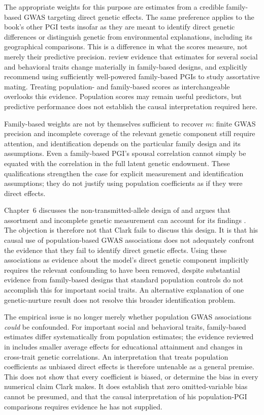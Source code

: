 \documentclass[12pt]{article}
\begin{document}
The appropriate weights for this purpose are estimates from a credible
family-based GWAS targeting direct genetic effects. The same preference
applies to the book's other PGI tests insofar as they are meant to identify
direct genetic differences or distinguish genetic from environmental
explanations, including its geographical comparisons. This is a difference
in what the scores measure, not merely their predictive precision.
\citet[Sections~4 and~6.4]{BenjaminEtAl2026} review evidence that estimates
for several social and behavioral traits change materially in family-based
designs, and explicitly recommend using sufficiently well-powered
family-based PGIs to study assortative mating. Treating population- and
family-based scores as interchangeable overlooks this evidence. Population
scores may remain useful predictors, but predictive performance does not
establish the causal interpretation required here.

Family-based weights are not by themselves sufficient to recover $m$:
finite GWAS precision and incomplete coverage of the relevant genetic
component still require attention, and identification depends on the
particular family design and its assumptions. Even a family-based PGI's
spousal correlation cannot simply be equated with the correlation in the
full latent genetic endowment. These qualifications strengthen the case
for explicit measurement and identification assumptions; they do not
justify using population coefficients as if they were direct effects.

Chapter~6 discusses the non-transmitted-allele design of
\citet{KongEtAl2018} and argues that assortment and incomplete genetic
measurement can account for its findings \citep[pp.~83--84]{Clark2026}.
The objection is therefore not that Clark fails to discuss this design.
It is that his causal use of population-based GWAS associations does not
adequately confront the evidence that they fail to identify direct genetic
effects. Using these associations as evidence about the model's direct
genetic component implicitly requires the relevant confounding to have
been removed, despite substantial evidence from family-based designs that
standard population controls do not accomplish this for important social
traits. An alternative explanation of one genetic-nurture result does not
resolve this broader identification problem.

The empirical issue is no longer merely whether population GWAS
associations \emph{could} be confounded. For important social and behavioral
traits, family-based estimates differ systematically from population
estimates; the evidence reviewed in
\citet[Section~4.6]{BenjaminEtAl2026} includes smaller average effects for
educational attainment and changes in cross-trait genetic correlations.
An interpretation that treats population coefficients as unbiased direct
effects is therefore untenable as a general premise. This does not show
that every coefficient is biased, or determine the bias in every numerical
claim Clark makes. It does establish that zero omitted-variable bias cannot
be presumed, and that the causal interpretation of his population-PGI
comparisons requires evidence he has not supplied.
\end{document}
